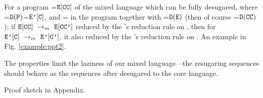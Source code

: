 \begin{property} \label{thm2}
	For a program =$\mbox{\tt E}[\mbox{\tt CC}]$ of the mixed language which can be fully desugared, where =$\mathtt{D}(\mbox{\tt P})$=$\mbox{\tt E'}[\mbox{\tt C}]$, and = in the program  together with =$\mathtt{D}(\mbox{\tt E})$ (then of course =$\mathtt{D}(\mbox{\tt CC})$); if $\mbox{\tt E}[\mbox{\tt CC}] ~\rightarrow_m~\mbox{\tt E}[\mbox{\tt CC'}]$ reduced by the 's reduction rule on , then for $\mbox{\tt E'}[\mbox{\tt C}] ~\rightarrow_m~\mbox{\tt E'}[\mbox{\tt C'}]$, it also reduced by the 's reduction rule on . An example in Fig. \ref{example:ppt2}.
\end{property}


The properties limit the laziness of our mixed language---the resugaring sequences should behave as the sequences after desugared to the core language.

Proof sketch in Appendix.

